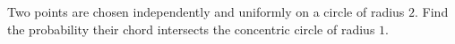 Two points are chosen independently and uniformly on a circle of radius $2$. Find the probability their chord intersects the concentric circle of radius $1$.
